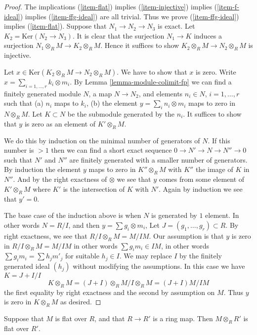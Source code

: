 \begin{proof}
The implications (\ref{item-flat}) implies (\ref{item-injective})
implies (\ref{item-f-ideal}) implies (\ref{item-ffg-ideal}) are all
trivial. Thus we prove (\ref{item-ffg-ideal}) implies (\ref{item-flat}).
Suppose that $N_1 \to N_2 \to N_3$ is exact.
Let $K_2 = \text{Ker}(N_2 \to N_3)$.
It is clear that the surjection $N_1 \to K$
induces a surjection $N_1 \otimes_R M \to K_2\otimes_R M$.
Hence it suffices to show $K_2\otimes_R M \to N_2\otimes_R M$
is injective.

\medskip\noindent
Let $x \in \text{Ker}(K_2\otimes_R M \to N_2\otimes_R M)$.
We have to show that $x$ is zero.
Write $x = \sum_{i = 1, \ldots, r} k_i \otimes m_i$. By
Lemma \ref{lemma-module-colimit-fp}
we can find a finitely generated module $N$,
a map $N \to N_2$, and elements $n_i \in N$, $i = 1, \ldots, r$ such that
(a) $n_i$ maps to $k_i$, (b) the element $y = \sum_i n_i \otimes m_i$
maps to zero in $N \otimes_R M$. Let $K \subset N$
be the submodule generated by the $n_i$. It suffices to show that
$y$ is zero as an element of $K' \otimes_R M$.

\medskip\noindent
We do this by induction on the minimal number of generators of
$N$. If this number is $>1$ then we can find a short exact
sequence
$0 \to N' \to N \to N''\to 0$
such that $N'$ and $N''$ are finitely generated with a smaller
number of generators. By induction the element $y$ maps
to zero in $K'' \otimes_R M$ with $K''$ the image of $K$
in $N''$. And by the right exactness of $\otimes$ we see
that $y$ comes from some element of $K' \otimes_R M$
where $K'$ is the intersection of $K$ with $N'$. Again
by induction we see that $y' = 0$.

\medskip\noindent
The base case of the induction above is when
$N$ is generated by $1$ element. In other words
$N = R/I$, and then $y = \sum g_i \otimes m_i$,
Let $J = (g_1, \ldots, g_r) \subset R$.
By right exactness, we see that $R/I \otimes_R M
= M/IM$. Our assumption is that $y$ is zero
in $R/I \otimes_R M = M/IM$ in other words
$\sum g_im_i \in IM$, in other words
$\sum g_im_i = \sum h_j m'_j$ for suitable
$h_j \in I$. We may replace $I$ by the finitely
generated ideal $(h_j)$ without modifying the assumptions.
In this case we have $K = J + I/I$
$$
K\otimes_R M
=
(J + I)\otimes_R M /I\otimes_R M
=
(J + I)M / IM
$$
the first equality by right exactness
and the second by assumption on $M$.
Thus $y$ is zero in $K\otimes_RM$ as desired.
\end{proof}

\begin{lemma}
\label{lemma-flat-base-change}
Suppose that $M$ is flat over $R$, and that $R \to R'$
is a ring map. Then $M\otimes_R R'$ is flat over $R'$.
\end{lemma}

